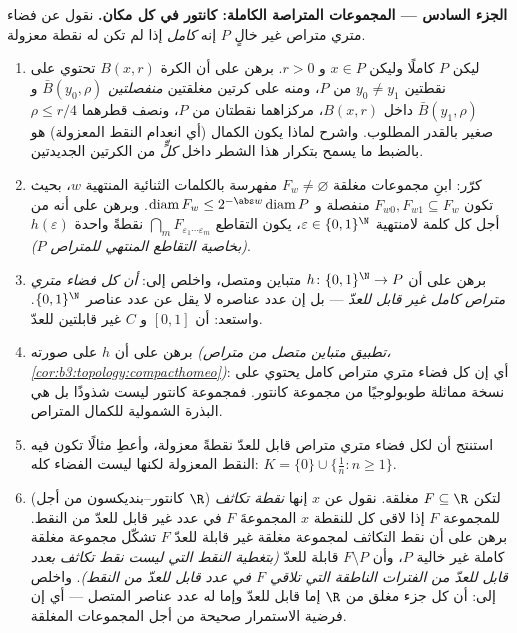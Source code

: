 \begin{problem}
\medskip
\noindent\textbf{الجزء السادس --- المجموعات المتراصة الكاملة:
كانتور في كل مكان.} نقول عن فضاء متري متراص غير خالٍ $P$ إنه
\emph{كامل} إذا لم تكن له نقطة معزولة.
\begin{enumerate}[resume]
  \item ليكن $P$  كاملًا وليكن $x \in P$ و $r > 0$. برهن
        على أن الكرة $B(x, r)$ تحتوي على نقطتين $y_0
        \neq y_1$ من $P$،
        ومنه على كرتين مغلقتين \emph{منفصلتين} $\bar B(y_0, \rho)$ و $\bar B(y_1, \rho)$
        داخل $B(x, r)$، مركزاهما نقطتان من $P$، ونصف قطرهما
        $\rho
        \leq r/4$ صغير بالقدر المطلوب. واشرح لماذا يكون الكمال
        (أي انعدام النقط المعزولة) هو بالضبط ما يسمح بتكرار هذا
        الشطر داخل \emph{كلٍّ} من الكرتين الجديدتين.
  \item كرّر: ابنِ مجموعات مغلقة $F_w \neq \varnothing$ مفهرسة بالكلمات
        الثنائية المنتهية $w$، بحيث تكون $F_{w0},
        F_{w1} \subseteq F_w$ منفصلة و
        $\operatorname{diam}F_w \leq 2^{-\abs w}
        \operatorname{diam}P$. وبرهن على أنه من أجل كل كلمة لامنتهية $\varepsilon \in \{0,1\}^\N$،
        يكون التقاطع $\bigcap_mF_{\varepsilon_1\cdots\varepsilon_m}$ نقطةً واحدة $h(\varepsilon)$
        \emph{(بخاصية التقاطع المنتهي للمتراص $P$)}.
  \item برهن على أن $h\colon\{0,1\}^\N \to P$ متباين ومتصل، واخلص إلى: \emph{أن
        كل فضاء متري متراص كامل غير قابل للعدّ} --- بل إن عدد عناصره
        لا يقل عن عدد عناصر $\{0,1\}^\N$. واستعد: أن $[0,1]$
        و $C$ غير قابلتين للعدّ.
  \item برهن على أن $h$  على صورته \emph{(تطبيق
        متباين متصل من متراص، \cref{cor:b3:topology:compacthomeo})}: أي إن كل فضاء متري
        متراص كامل يحتوي على نسخة مماثلة طوبولوجيًا من مجموعة
        كانتور. فمجموعة كانتور ليست شذوذًا بل هي البذرة
        الشمولية للكمال المتراص.
  \item استنتج أن لكل فضاء متري متراص قابل للعدّ نقطةً معزولة، وأعطِ
        مثالًا تكون فيه النقط المعزولة  لكنها ليست الفضاء
        كله: $K = \{0\} \cup
        \{\frac1n : n \geq 1\}$.
  \item (كانتور--بنديكسون من أجل $\R$) لتكن $F \subseteq \R$
        مغلقة. نقول عن $x$ إنها \emph{نقطة تكاثف} للمجموعة $F$
        إذا لاقى كل  للنقطة $x$ المجموعةَ $F$ في عدد غير
        قابل للعدّ من النقط. برهن على أن نقط التكاثف لمجموعة مغلقة
        غير قابلة للعدّ $F$ تشكّل مجموعة مغلقة كاملة غير خالية $P$،
        وأن $F
        \setminus P$ قابلة للعدّ \emph{(بتغطية النقط التي ليست نقط
        تكاثف بعدد قابل للعدّ من الفترات الناطقة التي تلاقي $F$ في
        عدد قابل للعدّ من النقط)}. واخلص إلى: أن كل جزء مغلق من $\R$
        إما قابل للعدّ وإما له عدد عناصر المتصل --- أي إن فرضية
        الاستمرار صحيحة من أجل المجموعات المغلقة.
\end{enumerate}


\end{problem}
